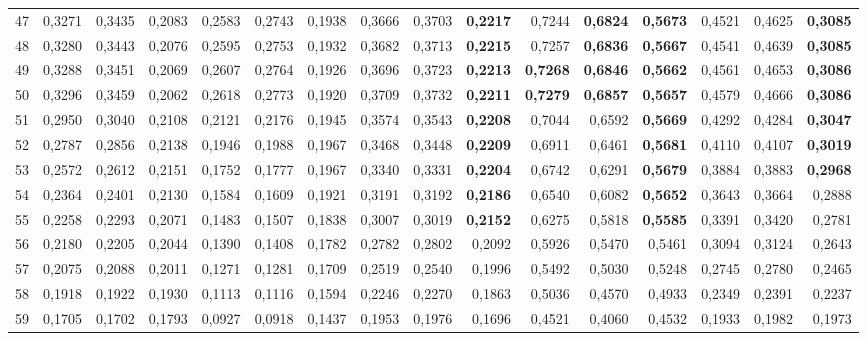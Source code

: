\begin{table}[htp!]
\begin{adjustwidth}{-2cm}{}
\begin{tabular}{ l | *{15}{| r}}
47	&	0,3271	&	0,3435	&	0,2083	&	0,2583	&	0,2743	&	0,1938	&	0,3666	&	0,3703	&	\textbf{0,2217}	&	0,7244	&	\textbf{0,6824}	&	\textbf{0,5673}	&	0,4521	&	0,4625	&	\textbf{0,3085}	\\
48	&	0,3280	&	0,3443	&	0,2076	&	0,2595	&	0,2753	&	0,1932	&	0,3682	&	0,3713	&	\textbf{0,2215}	&	0,7257	&	\textbf{0,6836}	&	\textbf{0,5667}	&	0,4541	&	0,4639	&	\textbf{0,3085}	\\
49	&	0,3288	&	0,3451	&	0,2069	&	0,2607	&	0,2764	&	0,1926	&	0,3696	&	0,3723	&	\textbf{0,2213}	&	\textbf{0,7268}	&	\textbf{0,6846}	&	\textbf{0,5662}	&	0,4561	&	0,4653	&	\textbf{0,3086}	\\
50	&	0,3296	&	0,3459	&	0,2062	&	0,2618	&	0,2773	&	0,1920	&	0,3709	&	0,3732	&	\textbf{0,2211}	&	\textbf{0,7279}	&	\textbf{0,6857}	&	\textbf{0,5657}	&	0,4579	&	0,4666	&	\textbf{0,3086}	\\
51	&	0,2950	&	0,3040	&	0,2108	&	0,2121	&	0,2176	&	0,1945	&	0,3574	&	0,3543	&	\textbf{0,2208}	&	0,7044	&	0,6592	&	\textbf{0,5669}	&	0,4292	&	0,4284	&	\textbf{0,3047}	\\
52	&	0,2787	&	0,2856	&	0,2138	&	0,1946	&	0,1988	&	0,1967	&	0,3468	&	0,3448	&	\textbf{0,2209}	&	0,6911	&	0,6461	&	\textbf{0,5681}	&	0,4110	&	0,4107	&	\textbf{0,3019}	\\
53	&	0,2572	&	0,2612	&	0,2151	&	0,1752	&	0,1777	&	0,1967	&	0,3340	&	0,3331	&	\textbf{0,2204}	&	0,6742	&	0,6291	&	\textbf{0,5679}	&	0,3884	&	0,3883	&	\textbf{0,2968}	\\
54	&	0,2364	&	0,2401	&	0,2130	&	0,1584	&	0,1609	&	0,1921	&	0,3191	&	0,3192	&	\textbf{0,2186}	&	0,6540	&	0,6082	&	\textbf{0,5652}	&	0,3643	&	0,3664	&	0,2888	\\
55	&	0,2258	&	0,2293	&	0,2071	&	0,1483	&	0,1507	&	0,1838	&	0,3007	&	0,3019	&	\textbf{0,2152}	&	0,6275	&	0,5818	&	\textbf{0,5585}	&	0,3391	&	0,3420	&	0,2781	\\
56	&	0,2180	&	0,2205	&	0,2044	&	0,1390	&	0,1408	&	0,1782	&	0,2782	&	0,2802	&	0,2092	&	0,5926	&	0,5470	&	0,5461	&	0,3094	&	0,3124	&	0,2643	\\
57	&	0,2075	&	0,2088	&	0,2011	&	0,1271	&	0,1281	&	0,1709	&	0,2519	&	0,2540	&	0,1996	&	0,5492	&	0,5030	&	0,5248	&	0,2745	&	0,2780	&	0,2465	\\
58	&	0,1918	&	0,1922	&	0,1930	&	0,1113	&	0,1116	&	0,1594	&	0,2246	&	0,2270	&	0,1863	&	0,5036	&	0,4570	&	0,4933	&	0,2349	&	0,2391	&	0,2237	\\
59	&	0,1705	&	0,1702	&	0,1793	&	0,0927	&	0,0918	&	0,1437	&	0,1953	&	0,1976	&	0,1696	&	0,4521	&	0,4060	&	0,4532	&	0,1933	&	0,1982	&	0,1973	\\

\end{tabular}
\end{adjustwidth}
\end{table}
